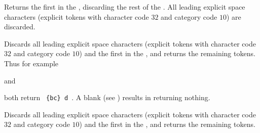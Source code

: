 \documentclass[oneside]{book}
\begin{document}
\begin{function}{\TlVarHead}
\begin{syntax}
 
\end{syntax}
Returns the first  in the ,
discarding the rest of the .
All leading explicit space characters (explicit tokens with character code $32$
and category code $10$) are discarded.
\begin{demohigh}
\TlSet {}
\TlVarHead \lTmpaTl
\end{demohigh}
\end{function}

\begin{function}{\TlTail}
\begin{syntax}
 
\end{syntax}
Discards all leading explicit space characters
(explicit tokens with character code $32$ and category code $10$)
and the first  in the , and returns the
remaining tokens. Thus for example
\begin{codehigh}
\end{codehigh}
and
\begin{codehigh}
\end{codehigh}
both return \verb*| {bc} d |.  A blank  (see )
results in  returning nothing.
\end{function}

\begin{function}{\TlVarTail}
\begin{syntax}
 
\end{syntax}
Discards all leading explicit space characters
(explicit tokens with character code $32$ and category code $10$)
and the first  in the , and returns the
remaining tokens.
\begin{demohigh}
\TlSet {}
\TlVarTail \lTmpaTl
\end{demohigh}
\end{function}
\end{document}
